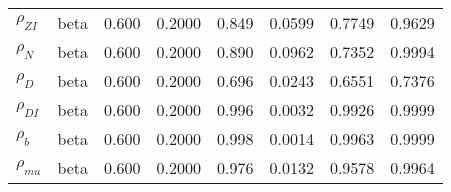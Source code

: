 \begin{center}
\begin{longtable}{llcccccc}
${\rho_{ZI}}$ & beta &   0.600 & 0.2000 &   0.849& 0.0599 &  0.7749 &  0.9629 \\ 
${\rho_N}$ & beta &   0.600 & 0.2000 &   0.890& 0.0962 &  0.7352 &  0.9994 \\ 
${\rho_D}$ & beta &   0.600 & 0.2000 &   0.696& 0.0243 &  0.6551 &  0.7376 \\ 
${\rho_{DI}}$ & beta &   0.600 & 0.2000 &   0.996& 0.0032 &  0.9926 &  0.9999 \\ 
${\rho_b}$ & beta &   0.600 & 0.2000 &   0.998& 0.0014 &  0.9963 &  0.9999 \\ 
${\rho_{mu}}$ & beta &   0.600 & 0.2000 &   0.976& 0.0132 &  0.9578 &  0.9964 \\ 
\end{longtable}
 \end{center}
